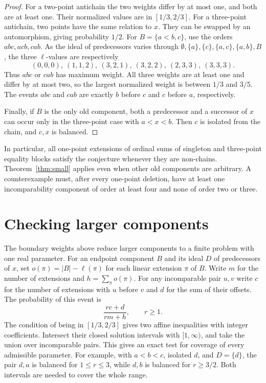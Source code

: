 \documentclass[10pt]{article}
\begin{document}
\begin{proof}
For a two-point antichain the two weights differ by at most one, and
both are at least one. Their normalized values are in \([1/3,2/3]\).
For a three-point antichain, two points have the same relation to \(x\).
They can be swapped by an automorphism, giving probability \(1/2\).
For \(B=\{a<b,c\}\), use the orders \(abc,acb,cab\). As the ideal of
predecessors varies through \(\emptyset,\{a\},\{c\},\{a,c\},\{a,b\},B\),
the three \(\ell\)-values are respectively
\[
(0,0,0),\ (1,1,2),\ (3,2,1),\ (3,2,2),\ (2,3,3),\ (3,3,3).
\]
Thus \(abc\) or \(cab\) has maximum weight. All three weights are at
least one and differ by at most two, so the largest normalized weight
is between \(1/3\) and \(3/5\). The events \(abc\) and \(cab\) are exactly
\(b\) before \(c\) and \(c\) before \(a\), respectively.

Finally, if \(B\) is the only old component, both a predecessor and
a successor of \(x\) can occur only in the three-point case with
\(a<x<b\). Then \(c\) is isolated from the chain, and \(c,x\) is balanced.
\end{proof}

In particular, all one-point extensions of ordinal sums of singleton
and three-point equality blocks satisfy the conjecture whenever they
are non-chains. Theorem~\ref{thm:small} applies even when other old
components are arbitrary. A counterexample must, after every one-point
deletion, have at least one incomparability component of order at least
four and none of order two or three.

\section*{Checking larger components}
The boundary weights above reduce larger components to a finite problem
with one real parameter. For an endpoint component \(B\) and its ideal
\(D\) of predecessors of \(x\), set \(o(\pi)=|B|-\ell(\pi)\) for each
linear extension \(\pi\) of \(B\). Write \(m\) for the number of
extensions and \(h=\sum_\pi o(\pi)\). For any incomparable pair \(u,v\)
write \(c\) for the number of extensions with \(u\) before \(v\) and \(d\)
for the sum of their offsets. The probability of this event is
\[
\frac{rc+d}{rm+h},\qquad r\ge1.
\]
The condition of being in \([1/3,2/3]\) gives two affine inequalities
with integer coefficients. Intersect their closed solution intervals
with \([1,\infty)\), and take the union over incomparable pairs.
This gives an exact test for coverage of every admissible parameter.
For example, with \(a<b<c\), isolated \(d\), and \(D=\{d\}\), the pair
\(d,a\) is balanced for \(1\le r\le3\), while \(d,b\) is balanced for
\(r\ge3/2\). Both intervals are needed to cover the whole range.
\end{document}
